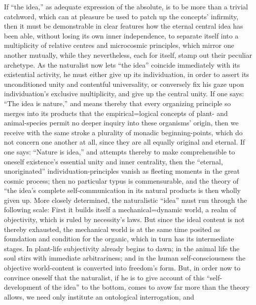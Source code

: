 \documentclass[12pt]{book}
\begin{document}
If ``the idea,'' as adequate expression of the absolute, is to be more than
a trivial catchword, which can at pleasure be used to patch up the concepts'
infirmity, then it must be demonstrable in clear features how the eternal
central idea has been able, without losing its own inner independence, to
separate itself into a multiplicity of relative centres and microcosmic
principles, which mirror one another mutually, while they nevertheless, each
for itself, stamp out their peculiar archetype. As the naturalist now lets
``the idea'' coincide immediately with its existential activity, he must
either give up its individuation, in order to assert its unconditioned unity
and contentful universality, or conversely fix his gaze upon individuation's
exclusive multiplicity, and give up the central unity. If one says: ``The
idea is nature,'' and means thereby that every organizing principle so
merges into its products that the empirical=logical concepts of plant- and
animal-species permit no deeper inquiry into these organisms' origin, then
we receive with the same stroke a plurality of monadic beginning-points,
which do not concern one another at all, since they are all equally original
and eternal. If one says: ``Nature is idea,'' and attempts thereby to make
comprehensible to oneself existence's essential unity and inner centrality,
then the ``eternal, unoriginated'' individuation-principles vanish as
fleeting moments in the great cosmic process; then no particular typus is
commensurable, and the theory of ``the idea's complete self-communication in
its natural products is then wholly given up. More closely determined, the
naturalistic ``idea'' must run through the following scale: First it builds
itself a mechanical=dynamic world, a realm of objectivity, which is ruled by
necessity's laws. But since the ideal content is not thereby exhausted, the
mechanical world is at the same time posited as foundation and condition for
the organic, which in turn has its intermediate stages. In plant-life
subjectivity already begins to dawn; in the animal life the soul stirs with
immediate arbitrariness; and in the human self-consciousness the objective
world-content is converted into freedom's form. But, in order now to
convince oneself that the naturalist, if he is to give account of this
``self-development of the idea'' to the bottom, comes to avow far more than
the theory allows, we need only institute an ontological interrogation, and
\end{document}
